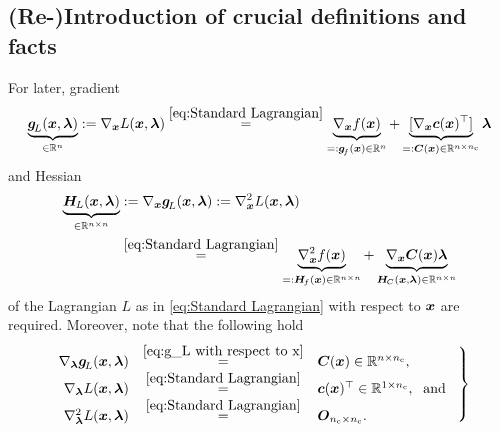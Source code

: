 \documentclass[journal]{IEEEtranTIE}
\newcommand{\CHHA}[1]{{\color{red} [CH: #1]}} %
\newcommand{\KYCH}[1]{{\color{blue} [KC: #1]}} %
\begin{document}
\subsection{(Re-)Introduction of crucial definitions and facts}
For later, gradient 
%
\begin{align}
\underbrace{\mv{g}_{\! L}(\mv{x},\mv{\lambda})}_{\in \R^n} := \nabla_{\mv{x}} L(\mv{x},\mv{\lambda}) \stackrel{\eqref{eq:Standard Lagrangian}}{=} \underbrace{\nabla_{\mv{x}} f(\mv{x})}_{=:\mv{g}_{\! f}(\mv{x}) \in \R^n} + \underbrace{[\nabla_{\mv{x}} \mv{c}(\mv{x})^\top]}_{=:\mm{C}(\mv{x}) \in \R^{n \times n_{\rm c} }} \mv{\lambda} 
\label{eq:g_L with respect to x}
\end{align}
%
and Hessian 
%
\begin{align}
\underbrace{\mm{H}_{\! L}(\mv{x},\mv{\lambda})}_{\in \R^{n \times n}} 
    & :=  \nabla_{\mv{x}} \mv{g}_{\! L}(\mv{x},\mv{\lambda}) := \nabla_{\mv{x}}^2 L(\mv{x},\mv{\lambda})  \notag \\
    & \stackrel{\eqref{eq:Standard Lagrangian}}{=} \underbrace{\nabla_{\mv{x}}^2 f(\mv{x})}_{=:\mm{H}_{\! f}(\mv{x}) \in \R^{n \times n}} + \underbrace{\nabla_{\mv{x}}  \mm{C}(\mv{x})\mv{\lambda}}_{\mm{H}_{\!C}(\mv{x},\mv{\lambda}) \in \R^{n \times n} }
\label{eq:H_L with respect to x}
\end{align}
%
of the Lagrangian $L$ as in \eqref{eq:Standard Lagrangian} with respect to $\boldsymbol{x}$ are required.
Moreover, note that the following hold
%
\begin{equation}
\left.\begin{array}{rcl}
 \nabla_{\mv{\lambda}} \mv{g}_{\! L}(\mv{x},\mv{\lambda}) & \stackrel{\eqref{eq:g_L with respect to x}}{=} & \mm{C}(\mv{x})  \in \R^{n \times n_{\rm c}}, \\ 
 \nabla_{\mv{\lambda}} L(\mv{x},\mv{\lambda}) & \stackrel{\eqref{eq:Standard Lagrangian}}{=} & \mv{c}(\mv{x})^\top \in \R^{1 \times n_{\rm c}}, \; \text{ and }\\ 
 \nabla_{\mv{\lambda}}^2 L(\mv{x},\mv{\lambda}) & \stackrel{\eqref{eq:Standard Lagrangian}}{=} & \mm{O}_{n_{\rm c} \times n_{\rm c}}.
 \end{array}\right\}
\label{eq:nabla_lambda g_L, nabla_lambda L and nabla_lambda^2 L}
\end{equation}
\end{document}
